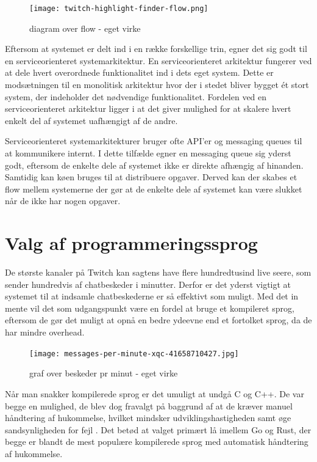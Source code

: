 \documentclass{article}
\begin{document}
\begin{figure}[hp]
\centering
\texttt{[image: twitch-highlight-finder-flow.png]}
\caption{diagram over flow - eget virke}
\end{figure}

Eftersom at systemet er delt ind i en række forskellige trin, egner det sig godt til en serviceorienteret systemarkitektur. En serviceorienteret arkitektur fungerer ved at dele hvert overordnede funktionalitet ind i dets eget system. Dette er modsætningen til en monolitisk arkitektur hvor der i stedet bliver bygget ét stort system, der indeholder det nødvendige funktionalitet. Fordelen ved en serviceorienteret arkitektur ligger i at det giver mulighed for at skalere hvert enkelt del af systemet uafhængigt af de andre.

Serviceorienteret systemarkitekturer bruger ofte API’er og messaging queues til at kommunikere internt. I dette tilfælde egner en messaging queue sig yderst godt, eftersom de enkelte dele af systemet ikke er direkte afhængig af hinanden. Samtidig kan køen bruges til at distribuere opgaver. Derved kan der skabes et flow mellem systemerne der gør at de enkelte dele af systemet kan være slukket når de ikke har nogen opgaver.

\section{Valg af programmeringssprog}
De største kanaler på Twitch kan sagtens have flere hundredtusind live seere, som sender hundredvis af chatbeskeder i minutter. Derfor er det yderst vigtigt at systemet til at indsamle chatbeskederne er så effektivt som muligt. Med det in mente vil det som udgangspunkt være en fordel at bruge et kompileret sprog, eftersom de gør det muligt at opnå en bedre ydeevne end et fortolket sprog, da de har mindre overhead.

\begin{figure}[hp]
\centering
\texttt{[image: messages-per-minute-xqc-41658710427.jpg]}
\caption{graf over beskeder pr minut - eget virke}
\end{figure}


Når man snakker kompilerede sprog er det umuligt at undgå C og C++. De var begge en mulighed, de blev dog fravalgt på baggrund af at de kræver manuel håndtering af hukommelse, hvilket mindsker udviklingshastigheden samt øge sandsynligheden for fejl \cite{thomas_proactive_2019}. Det betød at valget primært lå imellem Go og Rust, der begge er blandt de mest populære kompilerede sprog med automatisk håndtering af hukommelse.
\end{document}
